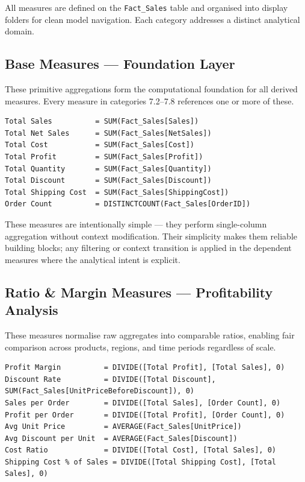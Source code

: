 \documentclass[11pt,a4paper]{article}
\begin{document}
All measures are defined on the \texttt{Fact\_Sales} table and organised into display folders for clean model navigation. Each category addresses a distinct analytical domain.

\subsection{Base Measures --- Foundation Layer}

These primitive aggregations form the computational foundation for all derived measures. Every measure in categories 7.2--7.8 references one or more of these.

\begin{lstlisting}
Total Sales          = SUM(Fact_Sales[Sales])
Total Net Sales      = SUM(Fact_Sales[NetSales])
Total Cost           = SUM(Fact_Sales[Cost])
Total Profit         = SUM(Fact_Sales[Profit])
Total Quantity       = SUM(Fact_Sales[Quantity])
Total Discount       = SUM(Fact_Sales[Discount])
Total Shipping Cost  = SUM(Fact_Sales[ShippingCost])
Order Count          = DISTINCTCOUNT(Fact_Sales[OrderID])
\end{lstlisting}

These measures are intentionally simple --- they perform single-column aggregation without context modification. Their simplicity makes them reliable building blocks; any filtering or context transition is applied in the dependent measures where the analytical intent is explicit.

\subsection{Ratio \& Margin Measures --- Profitability Analysis}

These measures normalise raw aggregates into comparable ratios, enabling fair comparison across products, regions, and time periods regardless of scale.

\begin{lstlisting}
Profit Margin          = DIVIDE([Total Profit], [Total Sales], 0)
Discount Rate          = DIVIDE([Total Discount], SUM(Fact_Sales[UnitPriceBeforeDiscount]), 0)
Sales per Order        = DIVIDE([Total Sales], [Order Count], 0)
Profit per Order       = DIVIDE([Total Profit], [Order Count], 0)
Avg Unit Price         = AVERAGE(Fact_Sales[UnitPrice])
Avg Discount per Unit  = AVERAGE(Fact_Sales[Discount])
Cost Ratio             = DIVIDE([Total Cost], [Total Sales], 0)
Shipping Cost % of Sales = DIVIDE([Total Shipping Cost], [Total Sales], 0)
\end{lstlisting}
\end{document}
